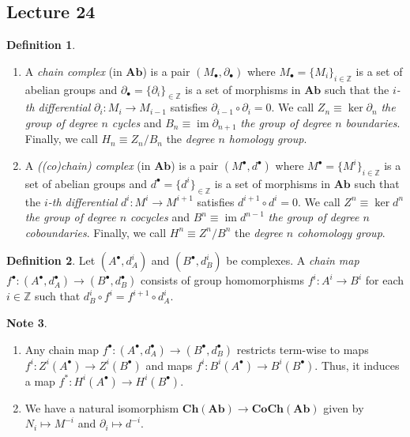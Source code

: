 \documentclass[10pt,letterpaper,cm]{nupset}
\theoremstyle{definition}
\newtheorem{definition}{Definition}[subsection]
\newtheorem{note}[definition]{Note}
\theoremstyle{theorem}
\theoremstyle{remark}
\newcommand{\Z}{\mathbb Z}
\newcommand{\1}{\mathbf{1}}
\newcommand{\0}{\vec 0}
\DeclareMathOperator{\im}{im}
\begin{document}
\subsection{Lecture 24}

\begin{definition} $ $
\begin{enumerate}
\item  A \textit{chain complex} (in $\mathbf{Ab}$) is a pair $(M_{\bullet}, \partial_{\bullet})$ where $M_{\bullet} = \{M_i\}_{i\in \Z}$ is a set of abelian groups and $\partial_{\bullet} =\{\partial_i\}_{\in \Z}$ is a set of morphisms in $\mathbf{Ab}$ such that the \textit{$i$-th differential} $\partial_i : M_i \to M_{i-1}$ satisfies $\partial_{i-1} \circ \partial_i = 0$. We call $Z_n \equiv \ker{\partial_{n}}$ \textit{the group of degree $n$ cycles} and $B_n \equiv \im{\partial_{n+1}}$ \textit{the group of degree $n$ boundaries}. Finally, we call $H_n \equiv Z_n/B_n$ the \textit{degree $n$ homology group}.
\item A \textit{((co)chain) complex} (in $\mathbf{Ab}$) is a pair $(M^{\bullet}, d^{\bullet})$ where $M^{\bullet} = \{M^i\}_{i\in \Z}$ is a set of abelian groups and $d^{\bullet} =\{d^i\}_{\in \Z}$ is a set of morphisms in $\mathbf{Ab}$ such that the \textit{$i$-th differential} $d^i : M^i \to M^{i+1}$ satisfies $d^{i+1} \circ d^i = 0$. We call $Z^n \equiv \ker{d^n}$ \textit{the group of degree $n$ cocycles} and $B^n \equiv \im{d^{n-1}}$ \textit{the group of degree $n$ coboundaries}. Finally, we call $H^n \equiv Z^n/B^n$ the \textit{degree $n$ cohomology group}.
\end{enumerate}
\end{definition}

\begin{definition} Let $(A^{\bullet}, d_A^i)$ and $(B^{\bullet}, d_B^i)$ be complexes.
 A \textit{chain map} $f^{\bullet} : (A^{\bullet}, d_A^{\bullet}) \to (B^{\bullet}, d_B^{\bullet})$ consists of group homomorphisms $f^i : A^i \to B^i$ for each $i\in \Z$ such that $d_B^i \circ f^i = f^{i+1} \circ d^i_A$. 
\end{definition}

\begin{note} $ $
\begin{enumerate}
\item Any chain map $f^{\bullet}: (A^{\bullet}, d_A^{\bullet}) \to (B^{\bullet}, d_B^{\bullet})$ restricts term-wise to maps $f^i :Z^i(A^{\bullet}) \to Z^i(B^{\bullet})$ and maps $f^i : B^i(A^{\bullet}) \to B^i(B^{\bullet})$. Thus, it induces a map $f^{\ast} : H^i(A^{\bullet}) \to H^i(B^{\bullet})$.
\item We have a natural isomorphism $\mathbf{Ch}(\mathbf{Ab}) \to \mathbf{CoCh}(\mathbf{Ab})$ given by $N_i \mapsto M^{-i}$ and $\partial_i \mapsto d^{-i}$.
\end{enumerate}
\end{note}
\end{document}
